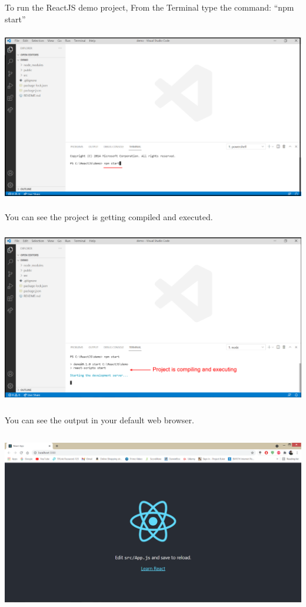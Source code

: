 \documentclass{article}
\begin{document}
\noindent To run the ReactJS demo project, From the Terminal type the command: ``npm start''
 

\begin{center}
	\noindent \includegraphics*[width=5.51in, height=2.96in]{IMG-06-42}
\end{center}

\newpage
\noindent You can see the project is getting compiled and executed.
 

\begin{center}
	\noindent \includegraphics*[width=5.67in, height=3.05in]{IMG-06-43}
\end{center}

\noindent You can see the output in your default web browser.
 

\begin{center}
	\noindent \includegraphics*[width=5.76in, height=3.12in]{IMG-06-44}
\end{center}
\end{document}
